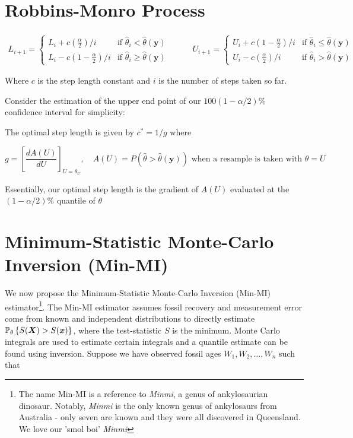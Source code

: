 \section{Robbins-Monro Process}

\begin{align*}
L_{i+1} = \begin{cases}
    L_i + c(\frac{\alpha}{2})/i &\text{if $\hat\theta_i < \hat\theta(\textbf{y})$} \\
    L_i - c(1 - \frac{\alpha}{2})/i &\text{if $\hat\theta_i \ge \hat\theta(\textbf{y})$} 
\end{cases}
&\quad\quad 
U_{i+1} = \begin{cases}
    U_i + c(1 - \frac{\alpha}{2})/i &\text{if $\hat\theta_i \le \hat\theta(\textbf{y})$}   \\
    U_i - c(\frac{\alpha}{2})/i & \text{if $\hat\theta_i > \hat\theta(\textbf{y})$}
\end{cases}
\end{align*}

Where $c$ is the step length constant and $i$ is the number of steps taken so far.

Consider the estimation of the upper end point of our $100(1-\alpha/2)\%$ confidence interval for simplicity:

The optimal step length is given by $c^* = 1/g$ where

\[
g = \left[ \frac{d A(U) }{dU} \right]_{U=\theta_U}, \quad A(U) = P\left(\hat\theta > \hat\theta(\bm{y})\right) \text{ when a resample is taken with $\theta = U$} 
\]

Essentially, our optimal step length is the gradient of $A(U)$ evaluated at the $(1-\alpha/2)\%$ quantile of $\theta$

\section{Minimum-Statistic Monte-Carlo Inversion (Min-MI)}\label{new-method}

We now propose the Minimum-Statistic Monte-Carlo Inversion (Min-MI) estimator\footnote{The name Min-MI is a reference to \textit{Minmi}, a genus of ankylosaurian dinosaur. Notably, \textit{Minmi} is the only known genus of ankylosaurs from Australia - only seven are known and they were all discovered in Queensland. We love our 'smol boi' \textit{Minmi}}. The Min-MI estimator assumes fossil recovery and measurement error come from known and independent distributions to directly estimate $\mathbb{P}_\theta\left\{S(\bm{X}) > S(\bm{x})\right\}$, where the test-statistic $S$ is the minimum. Monte Carlo integrals are used to estimate certain integrals and a quantile estimate can be found using inversion. Suppose we have observed fossil ages $W_1, W_2, \dots, W_n$ such that

